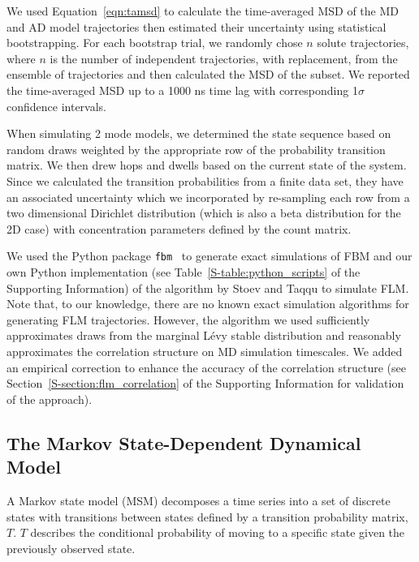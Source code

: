 \documentclass[journal=jctcce,manuscript=article]{achemso}
\begin{document}
  We used Equation~\ref{eqn:tamsd} to calculate the time-averaged MSD of the MD
  and AD model trajectories then estimated their uncertainty using statistical
  bootstrapping. For each bootstrap trial, we randomly chose $n$ solute
  trajectories, where $n$ is the number of independent trajectories, with
  replacement, from the ensemble of trajectories and then calculated the MSD of
  the subset. We reported the time-averaged MSD up to a 1000 ns time lag with
  corresponding 1$\sigma$ confidence intervals. 

  When simulating 2 mode models, we determined the state sequence based on
  random draws weighted by the appropriate row of the probability transition
  matrix. We then drew hops and dwells based on the current state of the
  system. Since we calculated the transition probabilities from a finite data
  set, they have an associated uncertainty which we incorporated by re-sampling
  each row from a two dimensional Dirichlet distribution (which is also a beta
  distribution for the 2D case) with concentration parameters defined by the
  count matrix.~\cite{bacallado_bayesian_2009}
  
  We used the Python package \texttt{fbm}~\cite{flynn_exact_2019} to generate exact simulations of FBM
  and our own Python implementation (see Table~\ref{S-table:python_scripts} of
  the Supporting Information) of the algorithm by Stoev and Taqqu to
  simulate FLM.~\cite{stoev_simulation_2004} Note that, to our knowledge, there
  are no known exact simulation algorithms for generating FLM trajectories.
  However, the algorithm we used sufficiently approximates draws from the
  marginal L\'evy stable distribution and reasonably approximates the
  correlation structure on MD simulation timescales. We added an empirical
  correction to enhance the accuracy of the correlation structure (see
  Section~\ref{S-section:flm_correlation} of the Supporting Information for
  validation of the approach).

  \subsection{The Markov State-Dependent Dynamical Model}\label{method:MSMs}  

  A Markov state model (MSM) decomposes a time series into a set of discrete
  states with transitions between states defined by a transition probability
  matrix, $T$.  $T$ describes the conditional probability of moving to a
  specific state given the previously observed
  state.~\cite{pande_everything_2010,wehmeyer_introduction_2018}
\end{document}
